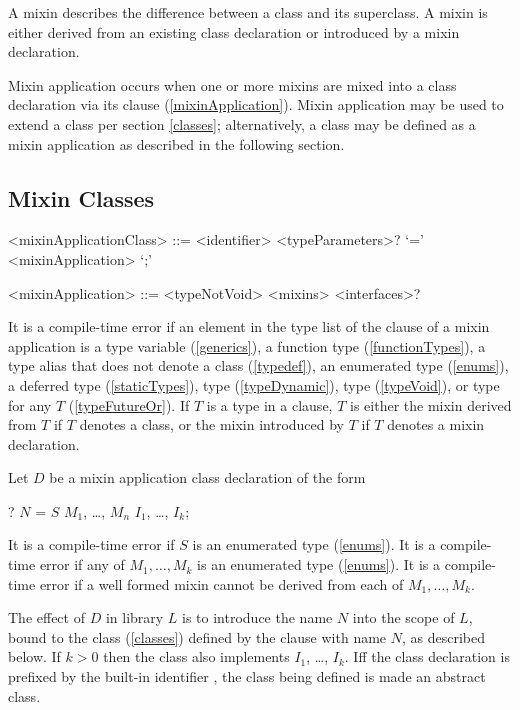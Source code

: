 \documentclass[makeidx]{article}
\begin{document}
\LMHash{}%
A mixin describes the difference between a class and its superclass.
A mixin is either derived from an existing class declaration
or introduced by a mixin declaration.

\LMHash{}%
Mixin application occurs when one or more mixins are mixed into a class declaration via its \WITH{} clause (\ref{mixinApplication}).
Mixin application may be used to extend a class per section \ref{classes};
alternatively, a class may be defined as a mixin application as described in the following section.

\subsection{Mixin Classes}

\begin{grammar}
<mixinApplicationClass> ::= \gnewline{}
  <identifier> <typeParameters>? `=' <mixinApplication> `;'

<mixinApplication> ::= <typeNotVoid> <mixins> <interfaces>?
\end{grammar}

\LMHash{}%
It is a compile-time error if an element in the type list of the \WITH{} clause of a mixin application is
a type variable (\ref{generics}),
a function type (\ref{functionTypes}),
a type alias that does not denote a class (\ref{typedef}),
an enumerated type (\ref{enums}),
a deferred type (\ref{staticTypes}),
type \DYNAMIC{} (\ref{typeDynamic}),
type \VOID{} (\ref{typeVoid}),
or type  for any $T$ (\ref{typeFutureOr}).
If $T$ is a type in a \WITH{} clause, 
$T$ is either the mixin derived from $T$ if $T$ denotes a class,
or the mixin introduced by $T$ if $T$ denotes a mixin declaration.

\LMHash{}%
Let $D$ be a mixin application class declaration of the form

\begin{normativeDartCode}
\ABSTRACT? \CLASS{} $N$ = $S$ \WITH{} $M_1$, \ldots{}, $M_n$ \IMPLEMENTS{} $I_1$, \ldots, $I_k$;
\end{normativeDartCode}

\LMHash{}%
It is a compile-time error if $S$ is an enumerated type (\ref{enums}).
It is a compile-time error if any of $M_1, \ldots, M_k$ is an enumerated type (\ref{enums}).
It is a compile-time error if a well formed mixin cannot be derived from each of $M_1, \ldots, M_k$.

\LMHash{}%
The effect of $D$ in library $L$ is to introduce the name $N$ into the scope of $L$, bound to the class (\ref{classes}) defined by the clause  with name $N$, as described below.
If $k > 0$ then the class also implements $I_1$, \ldots{}, $I_k$.
If{}f the class declaration is prefixed by the built-in identifier \ABSTRACT{}, the class being defined is made an abstract class.
\end{document}
